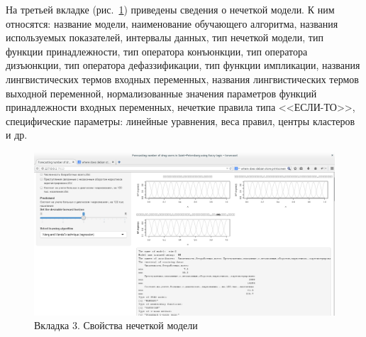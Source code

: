 На третьей вкладке (рис.~\ref{figure:screenshot3}) приведены сведения о нечеткой
модели. К ним относятся: название модели, наименование обучающего алгоритма,
названия используемых показателей, интервалы данных, тип нечеткой модели, тип
функции принадлежности, тип оператора конъюнкции, тип оператора дизъюнкции, тип
оператора дефаззификации, тип функции импликации, названия лингвистических
термов входных переменных, названия лингвистических термов выходной переменной,
нормализованные значения параметров функций принадлежности входных переменных,
нечеткие правила типа <<ЕСЛИ-ТО>>, специфические параметры: линейные уравнения,
веса правил, центры кластеров и др.

\begin{figure}[bhtp]
    \includegraphics{images/screenshot3.png}
    \caption{Вкладка 3. Свойства нечеткой модели}		
    \label{figure:screenshot3}
\end{figure}

